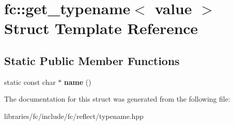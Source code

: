 \hypertarget{structfc_1_1get__typename_3_01value_01_4}{}\section{fc\+:\+:get\+\_\+typename$<$ value $>$ Struct Template Reference}
\label{structfc_1_1get__typename_3_01value_01_4}
\subsection*{Static Public Member Functions}
\begin{DoxyCompactItemize}
\item 
\mbox{\label{structfc_1_1get__typename_3_01value_01_4_a525a33c50bd000ab5b9d6b1fff5dd87a}} 
static const char $\ast$ {\bfseries name} ()
\end{DoxyCompactItemize}


The documentation for this struct was generated from the following file\+:\begin{DoxyCompactItemize}
\item 
libraries/fc/include/fc/reflect/typename.\+hpp\end{DoxyCompactItemize}
